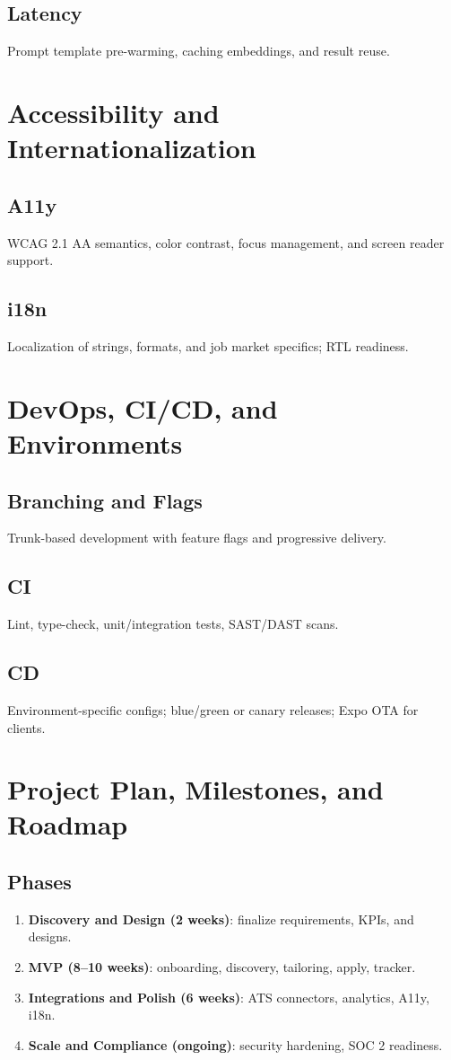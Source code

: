 \documentclass[12pt,a4paper]{article}
\begin{document}
\subsection{Latency}
Prompt template pre-warming, caching embeddings, and result reuse.

\section{Accessibility and Internationalization}
\subsection{A11y}
WCAG 2.1 AA semantics, color contrast, focus management, and screen reader support.
\subsection{i18n}
Localization of strings, formats, and job market specifics; RTL readiness.

\section{DevOps, CI/CD, and Environments}
\subsection{Branching and Flags}
Trunk-based development with feature flags and progressive delivery.
\subsection{CI}
Lint, type-check, unit/integration tests, SAST/DAST scans.
\subsection{CD}
Environment-specific configs; blue/green or canary releases; Expo OTA for clients.

\section{Project Plan, Milestones, and Roadmap}
\subsection{Phases}
\begin{enumerate}[leftmargin=2em]
  \item \textbf{Discovery and Design (2 weeks)}: finalize requirements, KPIs, and designs.
  \item \textbf{MVP (8--10 weeks)}: onboarding, discovery, tailoring, apply, tracker.
  \item \textbf{Integrations and Polish (6 weeks)}: ATS connectors, analytics, A11y, i18n.
  \item \textbf{Scale and Compliance (ongoing)}: security hardening, SOC 2 readiness.
\end{enumerate}
\end{document}
